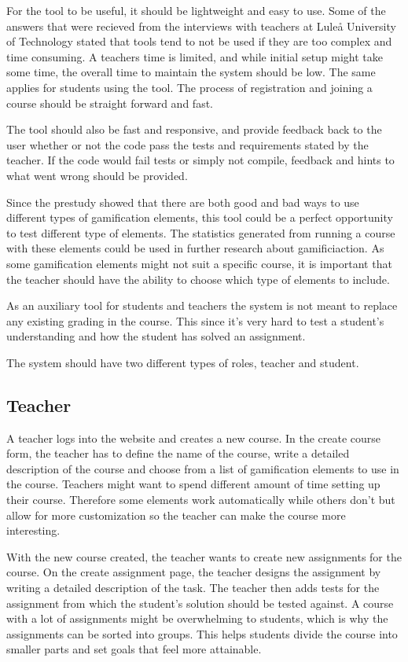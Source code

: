 For the tool to be useful, it should be lightweight and easy to use. Some of the answers that were recieved from the interviews with teachers at Luleå University of Technology stated that tools tend to not be used if they are too complex and time consuming. A teachers time is limited, and while initial setup might take some time, the overall time to maintain the system should be low. The same applies for students using the tool. The process of registration and joining a course should be straight forward and fast.

The tool should also be fast and responsive, and provide feedback back to the user whether or not the code pass the tests and requirements stated by the teacher. If the code would fail tests or simply not compile, feedback and hints to what went wrong should be provided.

Since the prestudy showed that there are both good and bad ways to use different types of gamification elements, this tool could be a perfect opportunity to test different type of elements. The statistics generated from running a course with these elements could be used in further research about gamificiaction. As some gamification elements might not suit a specific course, it is important that the teacher should have the ability to choose which type of elements to include. 

As an auxiliary tool for students and teachers the system is not meant to replace any existing grading in the course. This since it's very hard to test a student's understanding and how the student has solved an assignment. 

The system should have two different types of roles, teacher and student.

\subsection{Teacher}
A teacher logs into the website and creates a new course. In the create course form, the teacher has to define the name of the course, write a detailed description of the course and choose from a list of gamification elements to use in the course. Teachers might want to spend different amount of time setting up their course. Therefore some elements work automatically while others don't but allow for more customization so the teacher can make the course more interesting.

With the new course created, the teacher wants to create new assignments for the course. On the create assignment page, the teacher designs the assignment by writing a detailed description of the task. The teacher then adds tests for the assignment from which the student's solution should be tested against. A course with a lot of assignments might be overwhelming to students, which is why the assignments can be sorted into groups. This helps students divide the course into smaller parts and set goals that feel more attainable.

